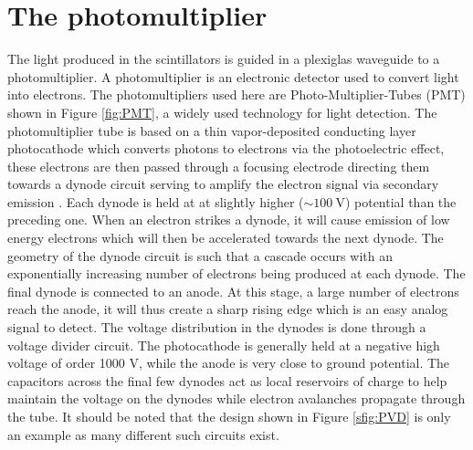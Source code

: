 \section{The photomultiplier}

The light produced in the scintillators is guided in a plexiglas waveguide to a photomultiplier. A photomultiplier is an electronic detector used to convert light into electrons. The photomultipliers used here are Photo-Multiplier-Tubes (PMT) shown in Figure \ref{fig:PMT}, a widely used technology for light detection. The photomultiplier tube is based on a thin vapor-deposited conducting layer photocathode which converts photons to electrons via the photoelectric effect, these electrons are then passed through a focusing electrode directing them towards a dynode circuit serving to amplify the electron signal via secondary emission \cite{Dekker1981}. Each dynode is held at at slightly higher ($\sim \SI{100}{\volt}$) potential than the preceding one. When an electron strikes a dynode, it will cause emission of low energy electrons which will then be accelerated towards the next dynode. The geometry of the dynode circuit is such that a cascade occurs with an exponentially increasing number of electrons being produced at each dynode. The final dynode is connected to an anode. At this stage, a large number of electrons reach the anode, it will thus create a sharp rising edge which is an easy analog signal to detect. The voltage distribution in the dynodes is done through a voltage divider circuit. The photocathode is generally held at a negative high voltage of order 1000 V, while the anode is very close to ground potential. The capacitors across the final few dynodes act as local reservoirs of charge to help maintain the voltage on the dynodes while electron avalanches propagate through the tube. It should be noted that the design shown in Figure \ref{sfig:PVD} is only an example as many different such circuits exist.

